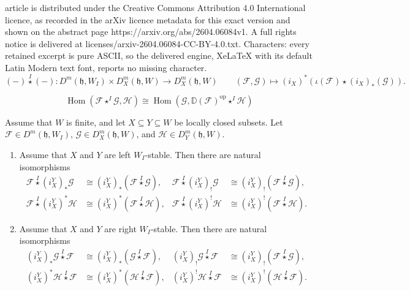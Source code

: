 \documentclass[10pt,a4paper]{amsart}
\newcommand{\BE}{D^m}
\newcommand{\DD}{\mathbb{D}}
\DeclareMathOperator{\Hom}{Hom}
\newcommand{\fr}[1]{\mathfrak{#1}}
\DeclareMathOperator{\op}{op}
\newcommand{\scrF}{\mathcal{F}}
\newcommand{\scrG}{\mathcal{G}}
\newcommand{\scrH}{\mathcal{H}}
\newcommand{\wistar}{\stackrel{I}{\star}}
\begin{document}
article is distributed under the Creative Commons Attribution 4.0 International licence, as recorded in the arXiv licence metadata for this exact version and shown on the abstract page https://arxiv.org/abs/2604.06084v1. A full rights notice is delivered at licenses/arxiv-2604.06084-CC-BY-4.0.txt. Characters: every retained excerpt is pure ASCII, so the delivered engine, XeLaTeX with its default Latin Modern text font, reports no missing character.
        \begin{equation}\label{eq:left_WI_action}
                (-) \wistar (-) : \BE (\fr{h}, W_I) \times \BE_X (\fr{h}, W) \to \BE_X (\fr{h}, W) \qquad (\scrF, \scrG) \mapsto (i_X)^* (\iota (\scrF) \star (i_X)_* (\scrG)).
        \end{equation}

        \begin{equation}\label{eq:rigid_hom_module}
                \Hom (\scrF \star^I \scrG, \scrH) \cong \Hom (\scrG, \DD (\scrF)^{\op} \star^I \scrH)
        \end{equation}

        \begin{proposition}\label{prop:pull_push_module_functors}
                Assume that $W$ is finite, and let $X \subseteq Y \subseteq W$ be locally closed subsets. Let $\scrF \in \BE (\fr{h}, W_I)$, $\scrG \in \BE_X (\fr{h}, W)$,  and $\scrH \in \BE_Y (\fr{h}, W)$.
                \begin{enumerate}
                        \item Assume that $X$ and $Y$ are left $W_I$-stable. Then there are natural isomorphisms
                        \begin{align*}
                                \scrF \wistar (i_X^Y)_* \scrG &\cong (i_X^Y)_* (\scrF \wistar \scrG), & \scrF \wistar (i_X^Y)_! \scrG &\cong (i_X^Y)_! (\scrF \wistar \scrG), \\
                                \scrF \wistar (i_X^Y)^* \scrH &\cong (i_X^Y)^* (\scrF \wistar \scrH), & \scrF \wistar (i_X^Y)^! \scrH &\cong (i_X^Y)^! (\scrF \wistar \scrH).
                        \end{align*}
                        \item Assume that $X$ and $Y$ are right $W_I$-stable. Then there are natural isomorphisms
                        \begin{align*}
                                (i_X^Y)_* \scrG \wistar \scrF &\cong (i_X^Y)_* (\scrG \wistar \scrF), & (i_X^Y)_! \scrG \wistar \scrF &\cong (i_X^Y)_! (\scrF \wistar \scrG), \\
                                (i_X^Y)^* \scrH \wistar \scrF &\cong (i_X^Y)^* (\scrH \wistar \scrF), & (i_X^Y)^! \scrH \wistar \scrF &\cong (i_X^Y)^! (\scrH \wistar \scrF).
                        \end{align*}
                \end{enumerate} 
        \end{proposition}
\end{document}

